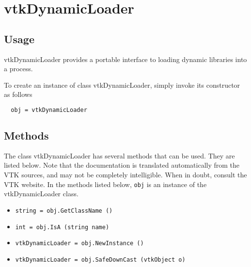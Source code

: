 \section{vtkDynamicLoader}

\subsection{Usage}

 vtkDynamicLoader provides a portable interface to loading dynamic
 libraries into a process.

To create an instance of class vtkDynamicLoader, simply
invoke its constructor as follows
\begin{verbatim}
  obj = vtkDynamicLoader
\end{verbatim}
\subsection{Methods}

The class vtkDynamicLoader has several methods that can be used.
  They are listed below.
Note that the documentation is translated automatically from the VTK sources,
and may not be completely intelligible.  When in doubt, consult the VTK website.
In the methods listed below, \verb|obj| is an instance of the vtkDynamicLoader class.
\begin{itemize}
\item  \verb|string = obj.GetClassName ()|

\item  \verb|int = obj.IsA (string name)|

\item  \verb|vtkDynamicLoader = obj.NewInstance ()|

\item  \verb|vtkDynamicLoader = obj.SafeDownCast (vtkObject o)|

\end{itemize}
